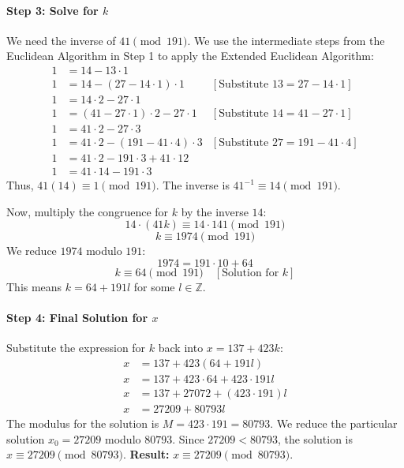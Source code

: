 \begin{solution}
\paragraph{Step 3: Solve for $k$}
We need the inverse of $41 \pmod{191}$. We use the intermediate steps from the Euclidean Algorithm in Step 1 to apply the Extended Euclidean Algorithm:
\begin{align*}
    1 &= 14 - 13 \cdot 1 \\
    1 &= 14 - (27 - 14 \cdot 1) \cdot 1 & [\text{Substitute } 13 = 27 - 14 \cdot 1] \\
    1 &= 14 \cdot 2 - 27 \cdot 1 \\
    1 &= (41 - 27 \cdot 1) \cdot 2 - 27 \cdot 1 & [\text{Substitute } 14 = 41 - 27 \cdot 1] \\
    1 &= 41 \cdot 2 - 27 \cdot 3 \\
    1 &= 41 \cdot 2 - (191 - 41 \cdot 4) \cdot 3 & [\text{Substitute } 27 = 191 - 41 \cdot 4] \\
    1 &= 41 \cdot 2 - 191 \cdot 3 + 41 \cdot 12 \\
    1 &= 41 \cdot 14 - 191 \cdot 3
\end{align*}
Thus, $41(14) \equiv 1 \pmod{191}$. The inverse is $41^{-1} \equiv 14 \pmod{191}$.

Now, multiply the congruence for $k$ by the inverse $14$:
$$ 14 \cdot (41k) \equiv 14 \cdot 141 \pmod{191} $$
$$ k \equiv 1974 \pmod{191} $$
We reduce $1974$ modulo $191$:
$$ 1974 = 191 \cdot 10 + 64 $$
$$ k \equiv 64 \pmod{191} \quad [\text{Solution for } k] $$
This means $k = 64 + 191l$ for some $l \in \mathbb{Z}$.

\paragraph{Step 4: Final Solution for $x$}
Substitute the expression for $k$ back into $x = 137 + 423k$:
\begin{align*}
    x &= 137 + 423(64 + 191l) \\
    x &= 137 + 423 \cdot 64 + 423 \cdot 191l \\
    x &= 137 + 27072 + (423 \cdot 191)l \\
    x &= 27209 + 80793l
\end{align*}
The modulus for the solution is $M = 423 \cdot 191 = 80793$.
We reduce the particular solution $x_0 = 27209$ modulo $80793$. Since $27209 < 80793$, the solution is $x \equiv 27209 \pmod{80793}$.
\textbf{Result:} $x \equiv 27209 \pmod{80793}$.
\end{solution}

